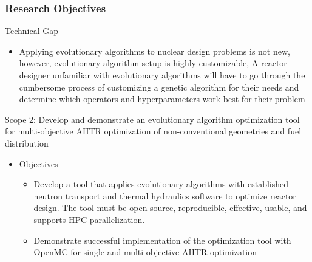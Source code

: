 \begin{frame}
    \frametitle{Research Objectives}
    \begin{block}{Technical Gap}
      \begin{itemize}
        \item Applying evolutionary algorithms to nuclear design problems is not new,
        however, evolutionary algorithm setup is highly customizable, A reactor 
        designer unfamiliar with evolutionary algorithms will have to go through 
        the cumbersome process of customizing a genetic algorithm for their
        needs and determine which operators and hyperparameters work best for their problem
      \end{itemize}
    \end{block}
    \begin{block}{Scope 2: Develop and demonstrate an evolutionary algorithm 
        optimization tool for multi-objective AHTR optimization of non-conventional 
        geometries and fuel distribution}
      \begin{itemize}
        \item Objectives
        \begin{itemize}
            \item Develop a tool that applies evolutionary algorithms with established 
            neutron transport and thermal hydraulics software to optimize reactor 
            design. The tool must be open-source, reproducible, effective, usable,
            and supports HPC parallelization. 
            \item Demonstrate successful implementation of the optimization tool 
            with OpenMC for single and multi-objective AHTR optimization
        \end{itemize}
        \end{itemize}
    \end{block}
  \end{frame}